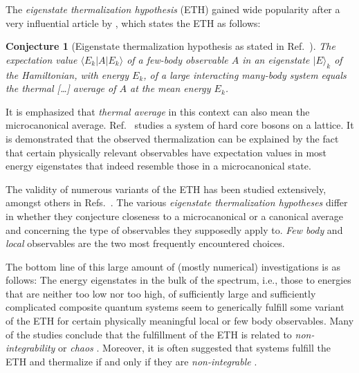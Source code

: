 \documentclass[a4paper,12pt,listof=totoc,index=totoc,bibliography=totoc,headsepline=false,headings=normal,BCOR16.153846mm,DIV12,headinclude,twoside,cleardoublepage=empty,numbers=noenddot,final]{scrreprt}
\theoremstyle{mystyle}
\numberwithin{equation}{section}
\numberwithin{figure}{section}
\numberwithin{lemma}{section}
\numberwithin{theorem}{section}
\numberwithin{corollary}{section}
\numberwithin{definition}{section}
\newtheorem{conjecture}{Conjecture}
\numberwithin{conjecture}{section}
\numberwithin{observation}{section}
\newcommand{\+}{\mkern2mu}
\newcommand{\bra}[1]{\langle #1|}
\newcommand{\ket}[1]{|#1\rangle}
\DeclareMathOperator{\1}{\mathds{1}}
\begin{document}
The \emph{eigenstate thermalization hypothesis} (ETH) gained wide popularity after a very influential article by \textcite{Rigol08}, which states the ETH as follows:
\begin{conjecture}[Eigenstate thermalization hypothesis as stated in Ref.~\cite{Rigol08}] \label{conjecture:ethrigolform}
  The expectation value $\bra{E_k} A \ket{E_k}$ of a few-body observable $A$ in an eigenstate $\ket E_k$ of the Hamiltonian, with energy $E_k$, of a large interacting many-body system equals the thermal [\dots] average of $A$ at the mean energy $E_k$.
\end{conjecture}
It is emphasized that \emph{thermal average} in this context can also mean the microcanonical average.
Ref.~\cite{Rigol08} studies a system of hard core bosons on a lattice.
It is demonstrated that the observed thermalization can be explained by the fact that certain physically relevant observables have expectation values in most energy eigenstates that indeed resemble those in a microcanonical state.

The validity of numerous variants of the ETH has been studied extensively, amongst others in Refs.~\cite{Santos10,Sirker2013,1102.0528v1,Biroli09,Singh,Ikeda11,Rigol08,Rigol11,1103.0787v1,Neuenhahn10,1108.0928v1,1111.6119,Mazets10,Polkovnikov11,Cassidy11,1104.3232v1,1004.2232v1,1201.0578v1,PhysRevLett.10-6,Polkovnikov11,Rigol09,1112.3424v1.pd,Cazalilla10,PhysRevB.82.17,Cazalilla11,Gritsev10,Iucci2009,Wilming2011,1108.0928v1,Steinigeweg2013,Beugeling2013,Ikeda2013a}.
The various \emph{eigenstate thermalization hypotheses} differ in whether they conjecture closeness to a microcanonical or a canonical average and concerning the type of observables they supposedly apply to.
\emph{Few body} and \emph{local} observables are the two most frequently encountered choices.

The bottom line of this large amount of (mostly numerical) investigations is as follows:
The energy eigenstates in the bulk of the spectrum, i.e., those to energies that are neither too low nor too high, of sufficiently large and sufficiently complicated composite quantum systems seem to generically fulfill some variant of the ETH for certain physically meaningful local or few body observables.
Many of the studies conclude that the fulfillment of the ETH is related to \emph{non-integrability} or \emph{chaos} \cite{1103.0787v1,1102.0528v1,Polkovnikov11,1108.0928v1,Neuenhahn10,Larson13,1201.0186v1,Beugeling2013,1112.3424v1.pd,Beugeling2013,Singh}.
Moreover, it is often suggested that systems fulfill the ETH and thermalize if and only if they are \emph{non-integrable} \cite{Rigol08,Rigol09,Rigol11,Biroli09,Znidaric09}.
\end{document}
